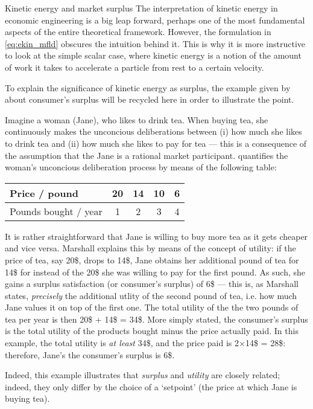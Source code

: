 \begin{econ}{Kinetic energy and market surplus}
    The interpretation of kinetic energy in economic engineering is a big leap forward, perhaps one of the most fundamental aspects of the entire theoretical framework. However, the formulation in \cref{eq:ekin_mfld} obscures the intuition behind it. This is why it is more instructive to look at the simple scalar case, where kinetic energy is a notion of the amount of work it takes to accelerate a particle from rest to a certain velocity.

    To explain the significance of kinetic energy as surplus, the example given by \citet[chap.~6]{Marshall1920} about consumer's surplus will be recycled here in order to illustrate the point.

    Imagine a woman (Jane), who likes to drink tea. When buying tea, she continuously makes the unconcious deliberations between (i) how much she likes to drink tea and (ii) how much she likes to pay for tea --- this is a consequence of the assumption that the Jane is a rational market participant. \citeauthor{Marshall1920} quantifies the woman's unconcious deliberation process by means of the following table:
    \begin{center}
        \begin{tabular}{lcccc}
            Price / pound & 20 & 14 & 10 & 6 \\
            \midrule
            Pounds bought / year & 1 & 2 & 3 & 4 \\
        \end{tabular}
    \end{center}
    It is rather straightforward that Jane is willing to buy more tea as it gets cheaper and vice versa. Marshall explains this by means of the concept of utility: if the price of tea, say 20\$, drops to 14\$, Jane obtains her additional pound of tea for 14\$ for instead of the 20\$ she was willing to pay for the first pound. As such, she gains a surplus satisfaction (or consumer's surplus) of 6\$ --- this is, as Marshall states, \emph{precisely} the additional utlity of the second pound of tea, i.e. how much Jane values it on top of the first one. The total utility of the the two pounds of tea per year is then 20\$ +  14\$ = 34\$. More simply stated, the consumer's surplus is the total utility of the products bought minus the price actually paid. In this example, the total utility is \emph{at least} 34\$, and the price paid is 2$\times$14\$ = 28\$: therefore, Jane's the consumer's surplus is 6\$. 
    \begin{center}
        
    \end{center}
    Indeed, this example illustrates that \emph{surplus} and \emph{utility} are closely related; indeed, they only differ by the choice of a `setpoint' (the price at which Jane is buying tea). 


\end{econ}
